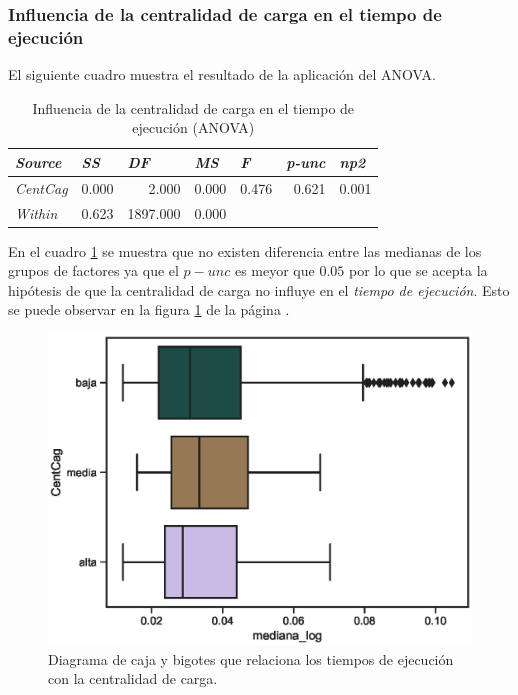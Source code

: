 \documentclass{article}
\begin{document}
\subsubsection{Influencia de la centralidad de carga en el tiempo de ejecución}

El siguiente cuadro muestra el resultado de la aplicación del ANOVA.

\begin{table}[htbp]
  \centering
  \caption{Influencia de la centralidad de carga en el tiempo de ejecución (ANOVA)}
    \begin{tabular}{lrrrrrr}
    \toprule
    \textit{\textbf{Source}} & \multicolumn{1}{l}{\textit{\textbf{SS}}} & \multicolumn{1}{l}{\textit{\textbf{DF}}} & \multicolumn{1}{l}{\textit{\textbf{MS}}} & \multicolumn{1}{l}{\textit{\textbf{F}}} & \multicolumn{1}{l}{\textit{\textbf{p-unc}}} & \multicolumn{1}{l}{\textit{\textbf{np2}}} \\
    \midrule
    \textit{CentCag} & 0.000 & 2.000 & 0.000 & 0.476 & 0.621 & 0.001 \\
    \textit{Within} & 0.623 & 1897.000 & 0.000 &       &       &  \\
    \bottomrule
    \end{tabular}%
  \label{tab:t9}%
\end{table}%

En el cuadro \ref{tab:t9} se muestra que no existen diferencia entre las medianas de los grupos de factores ya que el \emph{$p-unc$} es meyor que $0.05$ por lo que se acepta la hipótesis de que la centralidad de carga no influye en el \textit{tiempo de ejecución}. Esto se puede observar en la figura \ref{fig16} de la página \pageref{fig16}.

\begin{center}
\begin{figure}[htbp]
\includegraphics[scale=0.6]{boxplot_CentCag.eps}
\caption{Diagrama de caja y bigotes que relaciona los tiempos de ejecución con la centralidad de carga.}
\label{fig16}
\end{figure}
\end{center}
\end{document}
